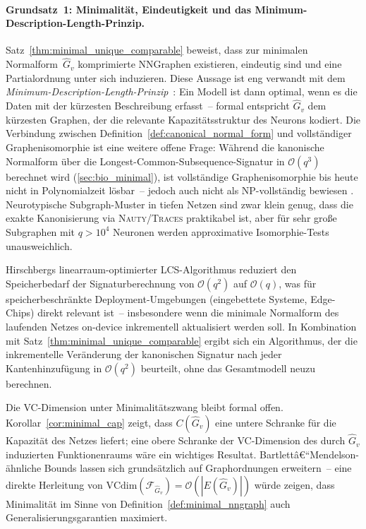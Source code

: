 ﻿\documentclass[12pt, a4paper, openany]{report}
\newcommand{\calF}{\mathcal{F}}
\begin{document}
\paragraph{Grundsatz~1: Minimalität, Eindeutigkeit und das Minimum-Description-Length-Prinzip.}
Satz~\ref{thm:minimal_unique_comparable} beweist, dass zur minimalen
Normal\-form~$\hat{G}_v$ komprimierte NNGraphen existieren, eindeutig sind
und eine Partialordnung unter sich induzieren.  Diese Aussage ist eng
verwandt mit dem
\emph{Minimum-Description-Length-Prinzip}~\cite{rissanen78}: Ein Modell ist
dann optimal, wenn es die Daten mit der kürzesten Beschreibung erfasst~--
formal entspricht $\hat{G}_v$ dem kürzesten Graphen, der die relevante
Kapazitäts\-struktur des Neurons kodiert.  Die Verbindung zwischen
Definition~\ref{def:canonical_normal_form} und vollständiger
Graphenisomorphie ist eine weitere offene Frage: Während die kanonische
Normalform über die Longest-Common-Subsequence-Signatur in $\mathcal{O}(q^3)$
berechnet wird (\cref{sec:bio_minimal}), ist vollständige Graphenisomorphie
bis heute nicht in Polynomialzeit lösbar~-- jedoch auch nicht als NP-vollständig
bewiesen \cite{mckay14}.  Neurotypische Subgraph-Muster in tiefen Netzen sind
zwar klein genug, dass die exakte Kanonisierung via \textsc{Nauty}/\textsc{Traces}
\cite{mckay14} praktikabel ist, aber für sehr große Subgraphen mit
$q > 10^4$ Neuronen werden approximative Isomorphie-Tests unausweichlich.

Hirschbergs linearraum-optimierter LCS-Algorithmus \cite{hirschberg75}
reduziert den Speicherbedarf der Signaturberechnung von $\mathcal{O}(q^2)$
auf $\mathcal{O}(q)$, was für speicherbeschränkte Deployment-Umgebungen
(eingebettete Systeme, Edge-Chips) direkt relevant ist~-- insbesondere wenn
die minimale Normalform des laufenden Netzes on-device inkrementell aktualisiert
werden soll.  In Kombination mit Satz~\ref{thm:minimal_unique_comparable}
ergibt sich ein Algorithmus, der die inkrementelle Veränderung der
kanonischen Signatur nach jeder Kanten\-hin\-zu\-fü\-gung in
$\mathcal{O}(q^2)$ beurteilt, ohne das Gesamtmodell neuzu berechnen.

Die VC-Dimension unter Minimalitätszwang bleibt formal offen.
Korollar~\ref{cor:minimal_cap} zeigt, dass $C(\hat{G}_v)$ eine untere
Schranke für die Kapazität des Netzes liefert; eine obere Schranke der
VC-Dimension des durch $\hat{G}_v$ induzierten Funktionenraums wäre ein
wichtiges Resultat.  Bartlettâ€“Mendelson-ähnliche Bounds \cite{bartlett_mendelson02}
lassen sich grundsätzlich auf Graphordnungen erweitern~-- eine direkte
Herleitung von $\text{VCdim}(\calF_{\hat{G}_v}) = \mathcal{O}(|E(\hat{G}_v)|)$
würde zeigen, dass Minimalität im Sinne von Definition~\ref{def:minimal_nngraph}
auch Generalisierungsgarantien maximiert.
\end{document}
